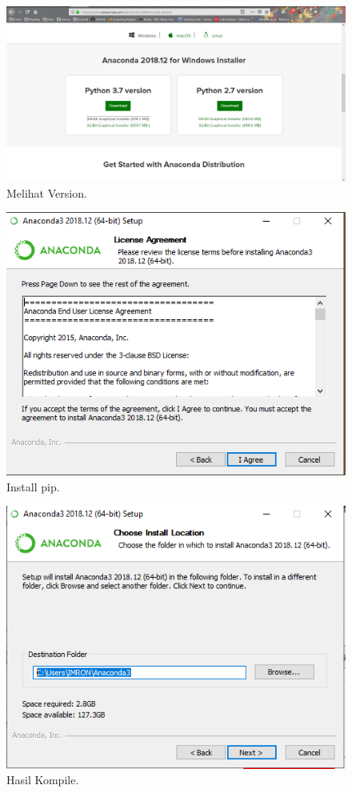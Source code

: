 \begin{enumerate}
\begin{figure}[ht]\centerline{\includegraphics[width=1\textwidth]{figures/1.PNG}}\caption{Melihat Version.}\end{figure}

\begin{figure}[ht]\centerline{\includegraphics[width=1\textwidth]{figures/3.PNG}}\caption{Install pip.}\end{figure}

\begin{figure}[ht]\centerline{\includegraphics[width=1\textwidth]{figures/5.PNG}}\caption{Hasil Kompile.}\end{figure}





\end{enumerate}
